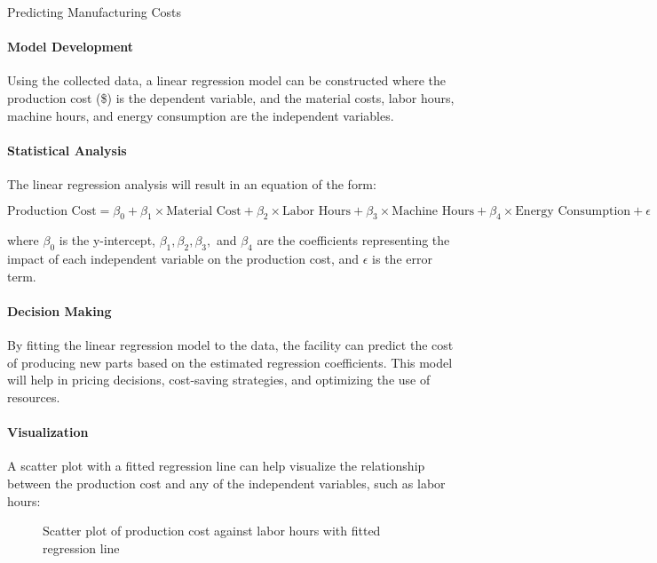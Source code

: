 \begin{examplewithcode}{Predicting Manufacturing Costs}{}
\paragraph{Model Development}

Using the collected data, a linear regression model can be constructed where the production cost (\$) is the dependent variable, and the material costs, labor hours, machine hours, and energy consumption are the independent variables.

\paragraph{Statistical Analysis}

The linear regression analysis will result in an equation of the form:

\begin{equation}
\text{Production Cost} = \beta_0 + \beta_1 \times \text{Material Cost} + \beta_2 \times \text{Labor Hours} + \beta_3 \times \text{Machine Hours} + \beta_4 \times \text{Energy Consumption} + \epsilon
\end{equation}

where $\beta_0$ is the y-intercept, $\beta_1, \beta_2, \beta_3,$ and $\beta_4$ are the coefficients representing the impact of each independent variable on the production cost, and $\epsilon$ is the error term.

\paragraph{Decision Making}

By fitting the linear regression model to the data, the facility can predict the cost of producing new parts based on the estimated regression coefficients. This model will help in pricing decisions, cost-saving strategies, and optimizing the use of resources.

\paragraph{Visualization}

A scatter plot with a fitted regression line can help visualize the relationship between the production cost and any of the independent variables, such as labor hours:

\begin{figure}[h!]
  \centering
  \caption{Scatter plot of production cost against labor hours with fitted regression line}
\end{figure}


\end{examplewithcode}

